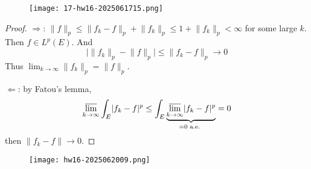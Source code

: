 \begin{exercise}
\begin{figure}[H]
\centering
\texttt{[image: 17-hw16-2025061715.png]}
\label{}
\end{figure}
\end{exercise}
\begin{proof}
$\Rightarrow$: $\lVert f \rVert_{p}\leq \lVert f_k-f \rVert_{p}+\lVert f_k \rVert_{p}\leq1+\lVert f_k \rVert_{p}<\infty$ for some large $k$. Then $f\in L^{p}(E)$. And
\[
\lvert \lVert f_k \rVert _{p}-\lVert f \rVert _{p} \rvert \leq \lVert f_k-f \rVert _{p}\to0
\]
Thus $\lim_{ k \to \infty }\lVert f_k \rVert_{p}=\lVert f \rVert_{p}$.

$\Leftarrow$: by Fatou's lemma,
\[
\varlimsup_{ k \to \infty } \int_{E}^{} \lvert f_k-f \rvert ^{p}\leq \int_{E}\underbrace{ \varlimsup_{ k \to \infty } \lvert f_k-f \rvert ^{p} }_{ =0\text{ a.e. } }=0
\]
then $\lVert f_k-f \rVert\to 0$.

\end{proof}
\begin{figure}[H]
\centering
\texttt{[image: hw16-2025062009.png]}
\label{}
\end{figure}
